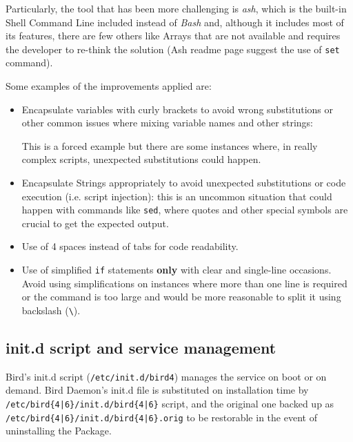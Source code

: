 Particularly, the tool that has been more challenging is \textit{ash}, which is the built-in Shell Command Line included instead of \textit{Bash} and, although it includes most of its features, there are few others like Arrays that are not available and requires the developer to re-think the solution (Ash readme page suggest the use of \texttt{set} command).

Some examples of the improvements applied are:
\begin{itemize}
    \item Encapsulate variables with curly brackets to avoid wrong substitutions or other common issues where mixing variable names and other strings:
     
    This is a forced example but there are some instances where, in really complex scripts, unexpected substitutions could happen.
    \item Encapsulate Strings appropriately to avoid unexpected substitutions or code execution (i.e. script injection): this is an uncommon situation that could happen with commands like \texttt{sed}, where quotes and other special symbols are crucial to get the expected output.
    \item Use of 4 spaces instead of tabs for code readability.
    \item Use of simplified \texttt{if} statements \textbf{only} with clear and single-line occasions. Avoid using simplifications on instances where more than one line is required or the command is too large and would be more reasonable to split it using backslash (\texttt{\textbackslash}).
    
\end{itemize}

\subsection{init.d script and service management}
\label{sec:initd}
Bird's init.d script (\texttt{/etc/init.d/bird4}) manages the service on boot or on demand. Bird Daemon's init.d file is substituted on installation time by \texttt{/etc/bird\{4|6\}/init.d/bird\{4|6\}} script, and the original one backed up as \texttt{/etc/bird\{4|6\}/init.d/bird\{4|6\}.orig} to be restorable in the event of uninstalling the Package.

